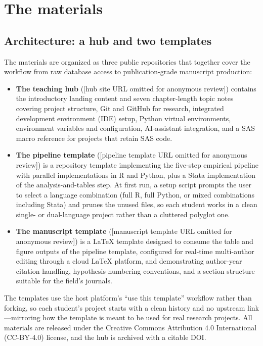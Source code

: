 \documentclass[12pt]{article}
\newcommand{\hubsite}{[hub site URL omitted for anonymous review]}
\newcommand{\pipelinerepo}{[pipeline template URL omitted for anonymous review]}
\newcommand{\manuscriptrepo}{[manuscript template URL omitted for anonymous review]}
\newcommand{\hubsite}{\url{https://eweisbrod.github.io/example-project/}}
\newcommand{\pipelinerepo}{\url{https://github.com/eweisbrod/project-template}}
\newcommand{\manuscriptrepo}{\url{https://github.com/eweisbrod/overleaf-template}}
\begin{document}
\section{The materials}
\label{sec:materials}

\subsection{Architecture: a hub and two templates}

The materials are organized as three public repositories that together
cover the workflow from raw database access to publication-grade
manuscript production:

\begin{itemize}[leftmargin=*]
  \item \textbf{The teaching hub} (\hubsite) contains the introductory
  landing content and seven chapter-length topic notes covering project
  structure, Git and GitHub for research, integrated development
  environment (IDE) setup, Python virtual environments, environment
  variables and configuration, AI-assistant integration, and a SAS macro
  reference for projects that retain SAS code.

  \item \textbf{The pipeline template} (\pipelinerepo) is a repository
  template implementing the five-step empirical pipeline with parallel
  implementations in R \citep{RCoreTeam} and Python, plus a Stata
  \citep{Stata} implementation of the analysis-and-tables step. At first
  run, a setup script prompts the user to select a language combination
  (full R, full Python, or mixed combinations including Stata) and prunes
  the unused files, so each student works in a clean single- or
  dual-language project rather than a cluttered polyglot one.

  \item \textbf{The manuscript template} (\manuscriptrepo) is a
  \LaTeX{} template designed to consume the table and figure outputs of
  the pipeline template, configured for real-time multi-author editing
  through a cloud \LaTeX{} platform, and demonstrating author-year
  citation handling, hypothesis-numbering conventions, and a section
  structure suitable for the field's journals.
\end{itemize}

The templates use the host platform's ``use this template'' workflow
rather than forking, so each student's project starts with a clean
history and no upstream link---mirroring how the template is meant to be
used for real research projects. All materials are released under the
Creative Commons Attribution 4.0 International (CC-BY-4.0) license, and
the hub is archived with a citable DOI.
\end{document}

